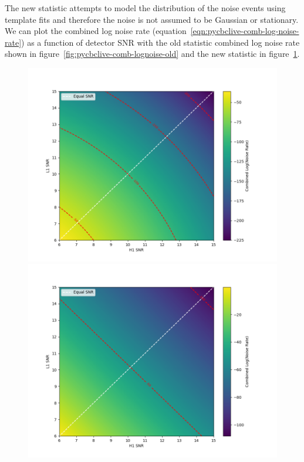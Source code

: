 The new statistic attempts to model the distribution of the noise events using template fits and therefore the noise is not assumed to be Gaussian or stationary. We can plot the combined log noise rate (equation~\ref{eqn:pycbclive-comb-log-noise-rate}) as a function of detector SNR with the old statistic combined log noise rate shown in figure~\ref{fig:pycbclive-comb-lognoise-old} and the new statistic in figure~\ref{fig:pycbclive-comb-lognoise-new}.
%
\begin{figure}
  \centering
  \begin{minipage}[t]{1.0\linewidth}
  
    \includegraphics[width=1\textwidth]{images/pycbclive/comb_lognoise_old_stat.png}
    \caption{}
    \label{fig:pycbclive-comb-lognoise-old}
  
  
    \includegraphics[width=1\textwidth]{images/pycbclive/comb_lognoise_new_stat.png}
    \caption{}
    \label{fig:pycbclive-comb-lognoise-new}
  
  \end{minipage}
\end{figure}
